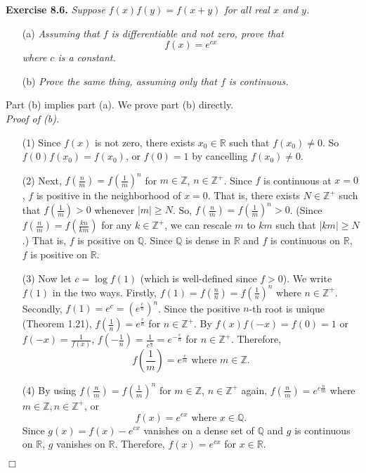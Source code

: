 \documentclass{article}
\begin{document}
\textbf{Exercise 8.6.}
\emph{Suppose $f(x)f(y) = f(x + y)$ for all real $x$ and $y$.}
\begin{enumerate}
\item[(a)]
\emph{Assuming that $f$ is differentiable and not zero, prove that
$$f(x) = e^{cx}$$
where $c$ is a constant.}
\item[(b)]
\emph{Prove the same thing, assuming only that $f$ is continuous.} \\
\end{enumerate}

Part (b) implies part (a). We prove part (b) directly. \\

\emph{Proof of (b).}
\begin{enumerate}
\item[(1)]
Since $f(x)$ is not zero, there exists $x_0 \in \mathbb{R}$ such that $f(x_0) \neq 0$.
So $f(0)f(x_0) = f(x_0)$, or $f(0) = 1$ by cancelling $f(x_0) \neq 0$.

\item[(2)]
Next, $f(\frac{n}{m}) = f(\frac{1}{m})^n$ for $m \in \mathbb{Z}$, $n \in \mathbb{Z}^{+}$.
Since $f$ is continuous at $x = 0$, $f$ is positive in the neighborhood of $x = 0$.
That is, there exists $N \in \mathbb{Z}^{+}$ such that $f(\frac{1}{m}) > 0$
whenever $|m| \geq N$.
So, $f(\frac{n}{m}) = f(\frac{1}{m})^n > 0$.
(Since $f(\frac{n}{m}) = f(\frac{kn}{km})$ for any $k \in \mathbb{Z}^{+}$,
we can rescale $m$ to $km$ such that $|km| \geq N$.)
That is, $f$ is positive on $\mathbb{Q}$.
Since $\mathbb{Q}$ is dense in $\mathbb{R}$ and $f$ is continuous on $\mathbb{R}$,
$f$ is positive on $\mathbb{R}$.

\item[(3)]
Now let $c = \log f(1)$ (which is well-defined since $f > 0$).
We write $f(1)$ in the two ways.
Firstly, $f(1) = f(\frac{n}{n}) = f(\frac{1}{n})^n$ where $n \in \mathbb{Z}^{+}$.
Secondly, $f(1) = e^c = (e^{\frac{c}{n}})^n$.
Since the positive $n$-th root is unique (Theorem 1.21),
$f(\frac{1}{n}) = e^{\frac{c}{n}}$ for $n \in \mathbb{Z}^{+}$.
By $f(x)f(-x) = f(0) = 1$ or $f(-x) = \frac{1}{f(x)}$,
$f(-\frac{1}{n}) = \frac{1}{e^{\frac{c}{n}}} = e^{-\frac{c}{n}}$ for $n \in \mathbb{Z}^{+}$.
Therefore,
\[
  f\left( \frac{1}{m} \right) = e^{\frac{c}{m}} \text{ where } m \in \mathbb{Z}.
\]

\item[(4)]
By using
$f(\frac{n}{m}) = f(\frac{1}{m})^n$ for $m \in \mathbb{Z}$, $n \in \mathbb{Z}^{+}$ again,
$f(\frac{n}{m}) = e^{c \frac{n}{m}}$ where $m \in \mathbb{Z}, n \in \mathbb{Z}^{+}$, or
$$f(x) = e^{cx} \text{ where } x \in \mathbb{Q}.$$
Since $g(x) = f(x) - e^{cx}$ vanishes on a dense set of $\mathbb{Q}$
and $g$ is continuous on $\mathbb{R}$, $g$ vanishes on $\mathbb{R}$.
Therefore, $f(x) = e^{cx}$ for $x \in \mathbb{R}$.
\end{enumerate}
$\Box$ \\
\end{document}
